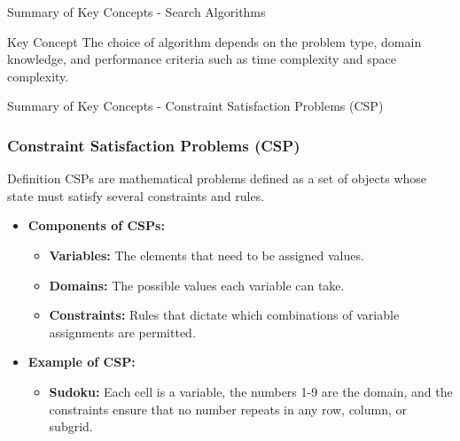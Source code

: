 \documentclass[aspectratio=169]{beamer}
\begin{document}
\begin{frame}[fragile]{Summary of Key Concepts - Search Algorithms}
    \begin{block}{Key Concept}
        The choice of algorithm depends on the problem type, domain knowledge, and performance criteria such as time complexity and space complexity.
    \end{block}
\end{frame}

\begin{frame}[fragile]{Summary of Key Concepts - Constraint Satisfaction Problems (CSP)}
    \frametitle{Constraint Satisfaction Problems (CSP)}
    \begin{block}{Definition}
        CSPs are mathematical problems defined as a set of objects whose state must satisfy several constraints and rules.
    \end{block}

    \begin{itemize}
        \item \textbf{Components of CSPs:}
            \begin{itemize}
                \item \textbf{Variables:} The elements that need to be assigned values.
                \item \textbf{Domains:} The possible values each variable can take.
                \item \textbf{Constraints:} Rules that dictate which combinations of variable assignments are permitted.
            \end{itemize}

        \item \textbf{Example of CSP:} 
            \begin{itemize}
                \item \textbf{Sudoku:} Each cell is a variable, the numbers 1-9 are the domain, and the constraints ensure that no number repeats in any row, column, or subgrid.
            \end{itemize}
    \end{itemize}
\end{frame}
\end{document}
